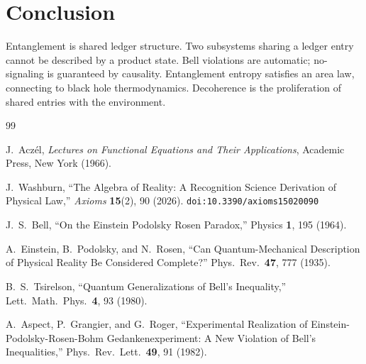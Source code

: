 \documentclass[12pt,a4paper]{article}
\theoremstyle{definition}
\theoremstyle{remark}
\begin{document}
\section{Conclusion}
\label{sec:conclusion}

Entanglement is shared ledger structure.  Two subsystems sharing a
ledger entry cannot be described by a product state.  Bell
violations are automatic; no-signaling is guaranteed by causality.
Entanglement entropy satisfies an area law, connecting to black
hole thermodynamics.  Decoherence is the proliferation of shared
entries with the environment.

\begin{thebibliography}{99}

J.~Acz\'el, \emph{Lectures on Functional Equations and Their Applications},
Academic Press, New York (1966).

J.~Washburn, ``The Algebra of Reality: A Recognition Science Derivation
of Physical Law,'' \emph{Axioms} \textbf{15}(2), 90 (2026).
\texttt{doi:10.3390/axioms15020090}

J.~S.~Bell, ``On the Einstein Podolsky Rosen Paradox,''
Physics \textbf{1}, 195 (1964).

A.~Einstein, B.~Podolsky, and N.~Rosen, ``Can Quantum-Mechanical
Description of Physical Reality Be Considered Complete?''
Phys.\ Rev.\ \textbf{47}, 777 (1935).

B.~S.~Tsirelson, ``Quantum Generalizations of Bell's Inequality,''
Lett.\ Math.\ Phys.\ \textbf{4}, 93 (1980).

A.~Aspect, P.~Grangier, and G.~Roger, ``Experimental Realization
of Einstein-Podolsky-Rosen-Bohm Gedankenexperiment: A New
Violation of Bell's Inequalities,'' Phys.\ Rev.\ Lett.\
\textbf{49}, 91 (1982).

\end{thebibliography}
\end{document}
